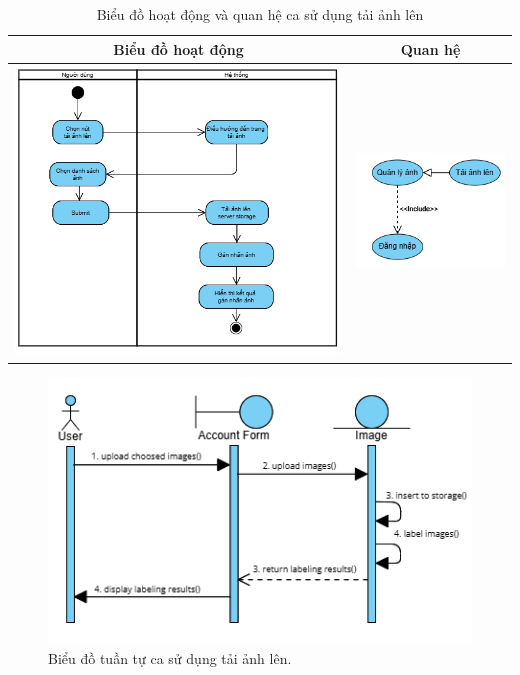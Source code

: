 \noindent 

\begin{table}[H]
\centering
\caption{Biểu đồ hoạt động và quan hệ ca sử dụng tải ảnh lên}
\label{tab:upload-image-usecase-activity}
\begin{tabular}{| c | c |}
    \hline
    \textbf{Biểu đồ hoạt động} & \textbf{Quan hệ} \\ 
    \hline
    \includegraphics[width=0.6\linewidth]{figures/c3/3-3-4-activity-diagram.png} 
    & 
    \includegraphics[width=0.35\linewidth]{figures/c3/3-3-4-relationship.png} \\ 
    \hline
\end{tabular}
\end{table}

\begin{figure}[H]
    \centering  
    \includegraphics[width=1\textwidth]{figures/c3/3-3-4-sequence-diagram.png}
    \caption{Biểu đồ tuần tự ca sử dụng tải ảnh lên.}
    \label{fig:3-3-4-sequence-diagram}
\end{figure}